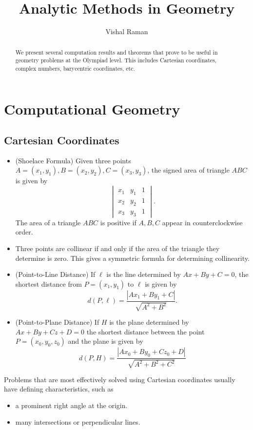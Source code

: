 \documentclass[11pt]{scrartcl}
\begin{document}
\title{Analytic Methods in Geometry}
\author{Vishal Raman}
\maketitle
\begin{abstract}
We present several computation results and theorems that prove to be useful in geometry problems at the Olympiad level.  This includes Cartesian coordinates, complex numbers, barycentric coordinates, etc.  
\end{abstract}
\tableofcontents
\pagebreak
\section{Computational Geometry}
\subsection{Cartesian Coordinates}
\begin{itemize}
\item (Shoelace Formula) Given three points $A = (x_1, y_1), B = (x_2, y_2), C = (x_3, y_3)$, the signed area of triangle $ABC$ is given by
$$\begin{vmatrix}
x_1 &y_1  &1 \\ 
 x_2&y_2  &1 \\ 
 x_3&y_3  &1 
\end{vmatrix}.$$
The area of a triangle $ABC$ is positive if $A, B, C$ appear in counterclockwise order.
\item Three points are collinear if and only if the area of the triangle they determine is zero.  This gives a symmetric formula for determining collinearity.
\item (Point-to-Line Distance) If $\ell$ is the line determined by $Ax + By + C = 0$, the shortest distance from $P=(x_1, y_1)$ to $\ell$ is given by 
$$d(P, \ell) = \frac{|Ax_1 + By_1 + C|}{\sqrt{A^2 + B^2}}.$$
\item (Point-to-Plane Distance) If $H$ is the plane determined by  $Ax + By + Cz + D = 0$  the shortest distance between the point $P = (x_0, y_0, z_0)$ and the plane is given by
$$d(P, H) = \frac{|Ax_0 + By_0 + Cz_0 +D |}{\sqrt{A^2 + B^2 + C^2}}$$
\end{itemize}
Problems that are most effectively solved using Cartesian coordinates usually have defining characteristics, such as
\begin{itemize}
\item a prominent right angle at the origin.
\item many intersections or perpendicular lines.
\end{itemize}
\end{document}
